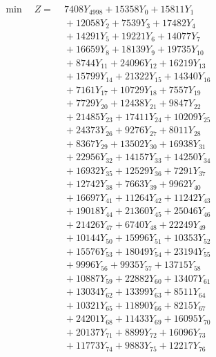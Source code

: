 \documentclass[a4paper,10pt]{article}
\begin{document}
\allowdisplaybreaks
{\small
\begin{align}
\min \quad Z = &\; 7408 Y_{4998} + 15358 Y_{0} + 15811 Y_{1} \\[0.3ex]
&\;  + 12058 Y_{2} + 7539 Y_{3} + 17482 Y_{4} \\[0.3ex]
&\;  + 14291 Y_{5} + 19221 Y_{6} + 14077 Y_{7} \\[0.3ex]
&\;  + 16659 Y_{8} + 18139 Y_{9} + 19735 Y_{10} \\[0.3ex]
&\;  + 8744 Y_{11} + 24096 Y_{12} + 16219 Y_{13} \\[0.3ex]
&\;  + 15799 Y_{14} + 21322 Y_{15} + 14340 Y_{16} \\[0.3ex]
&\;  + 7161 Y_{17} + 10729 Y_{18} + 7557 Y_{19} \\[0.3ex]
&\;  + 7729 Y_{20} + 12438 Y_{21} + 9847 Y_{22} \\[0.3ex]
&\;  + 21485 Y_{23} + 17411 Y_{24} + 10209 Y_{25} \\[0.3ex]
&\;  + 24373 Y_{26} + 9276 Y_{27} + 8011 Y_{28} \\[0.5ex]\allowbreak
&\;  + 8367 Y_{29} + 13502 Y_{30} + 16938 Y_{31} \\[0.3ex]
&\;  + 22956 Y_{32} + 14157 Y_{33} + 14250 Y_{34} \\[0.3ex]
&\;  + 16932 Y_{35} + 12529 Y_{36} + 7291 Y_{37} \\[0.3ex]
&\;  + 12742 Y_{38} + 7663 Y_{39} + 9962 Y_{40} \\[0.3ex]
&\;  + 16697 Y_{41} + 11264 Y_{42} + 11242 Y_{43} \\[0.3ex]
&\;  + 19018 Y_{44} + 21360 Y_{45} + 25046 Y_{46} \\[0.3ex]
&\;  + 21426 Y_{47} + 6740 Y_{48} + 22249 Y_{49} \\[0.3ex]
&\;  + 10144 Y_{50} + 15996 Y_{51} + 10353 Y_{52} \\[0.3ex]
&\;  + 15576 Y_{53} + 18049 Y_{54} + 23194 Y_{55} \\[0.3ex]
&\;  + 9996 Y_{56} + 9935 Y_{57} + 13715 Y_{58} \\[0.5ex]\allowbreak
&\;  + 10887 Y_{59} + 22882 Y_{60} + 13407 Y_{61} \\[0.3ex]
&\;  + 13034 Y_{62} + 13399 Y_{63} + 8511 Y_{64} \\[0.3ex]
&\;  + 10321 Y_{65} + 11890 Y_{66} + 8215 Y_{67} \\[0.3ex]
&\;  + 24201 Y_{68} + 11433 Y_{69} + 16095 Y_{70} \\[0.3ex]
&\;  + 20137 Y_{71} + 8899 Y_{72} + 16096 Y_{73} \\[0.3ex]
&\;  + 11773 Y_{74} + 9883 Y_{75} + 12217 Y_{76} \\[0.3ex]

\end{align}}
\end{document}
